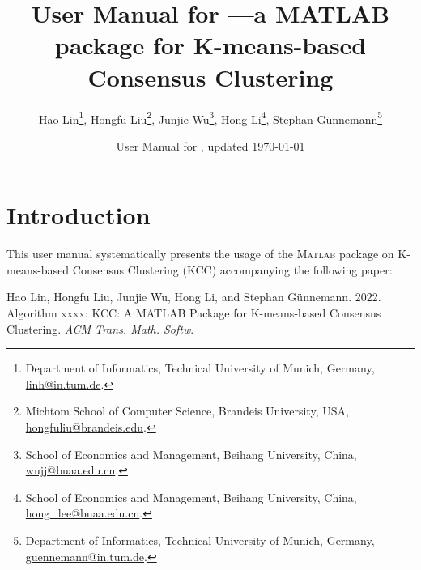 \documentclass[10pt]{acmtrans2e}
\title{User Manual for \package{KCC}---a {MATLAB} package for K-means-based Consensus Clustering}
\author{
Hao Lin\footnote{Department of Informatics, Technical University of Munich, Germany,
\textsf{\href{mailto:linh@in.tum.de}{linh@in.tum.de}}.}, \quad
Hongfu Liu\footnote{Michtom School of Computer Science, Brandeis University, USA, \textsf{\href{mailto:hongfuliu@brandeis.edu}{hongfuliu@brandeis.edu}}.}, \quad
Junjie Wu\footnote{School of Economics and Management, Beihang University, China, \textsf{\href{mailto:wujj@buaa.edu.cn}{wujj@buaa.edu.cn}}.}, \quad
Hong Li\footnote{School of Economics and Management, Beihang University, China, \textsf{\href{mailto:hong_lee@buaa.edu.cn}{hong\_lee@buaa.edu.cn}}.}, \quad
Stephan Günnemann\footnote{Department of Informatics, Technical University of Munich, Germany, \textsf{\href{mailto:guennemann@in.tum.de}{guennemann@in.tum.de}}.}
}
\date{User Manual for \package{KCC}, updated \today}
\newcommand{\Matlab}{\textsc{Matlab}}
\begin{document}
\maketitle

\vspace*{-0.5cm}

\section{Introduction}

This user manual systematically presents the usage of the \Matlab{} package on K-means-based Consensus Clustering (KCC) accompanying the following paper:
\begin{center}
\begin{minipage}{0.90\textwidth}
Hao Lin, Hongfu Liu, Junjie Wu, Hong Li, and Stephan Günnemann. 2022. Algorithm xxxx: KCC: A MATLAB Package for K-means-based Consensus Clustering. \emph{ACM Trans. Math. Softw}.
\end{minipage}
\end{center}
\end{document}
